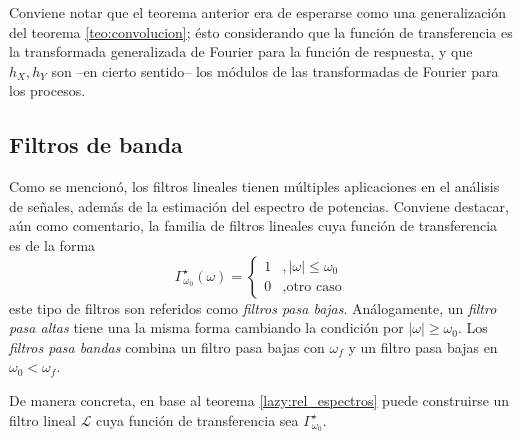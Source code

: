 \documentclass[12pt,letterpaper]{book}
\newcommand{\SEN}[1]{\mathrm{sen}\left( #1 \right)}
\newcommand{\abso}[1]{\left| #1 \right|}
\begin{document}
Conviene notar que el teorema anterior era de esperarse como una generalización del teorema \ref{teo:convolucion}; ésto considerando que la función de transferencia es la transformada generalizada de Fourier para la función de respuesta, y que $h_X, h_Y$ son --en cierto sentido-- los módulos de las transformadas de Fourier para los procesos.

\subsection{Filtros de banda}

Como se mencionó, los filtros lineales tienen múltiples aplicaciones en el análisis de señales, además de la estimación del espectro de potencias.
%
Conviene destacar, aún como comentario, la familia de filtros lineales cuya función de transferencia es de la forma
\begin{equation}
\Gamma_{\omega_0}^{\star} (\omega) = \begin{cases}
1 &, \abso{\omega} \leq \omega_0 \\
0 &, \text{otro caso}
\end{cases}
\end{equation}
este tipo de filtros son referidos como \textit{filtros pasa bajas}.
%
Análogamente, un \textit{filtro pasa altas} tiene una la misma forma cambiando la condición por $\abso{\omega} \geq \omega_0$.
%
Los \textit{filtros pasa bandas} combina un filtro pasa bajas con $\omega_f$ y un filtro pasa bajas en $\omega_0 < \omega_f$.

De manera concreta, en base al teorema \ref{lazy:rel_espectros} puede construirse un filtro lineal $\mathcal{L}$ cuya función de transferencia sea $\Gamma_{\omega_0}^{\star}$.
%
\end{document}
